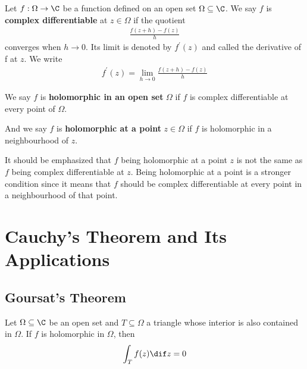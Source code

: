\documentclass[thmcnt=section, color=cyan, 12pt]{my-elegantbook}
\begin{document}
\begin{definition}
	Let $f: \Omega \to \C$ be a function defined on an open set $\Omega \subseteq \C$.
	We say $f$ is \textbf{complex differentiable}
	at $z \in \Omega$ if the quotient
	\begin{align*}
		\frac{f(z + h) - f(z)}{h}
	\end{align*}
	converges when $h \to 0$.
	Its limit is denoted by $f^\prime(z)$
	and called the derivative of f at $z$.
	We write
	\begin{align*}
		f^\prime(z) = \lim_{h \to 0} \frac{f(z + h) - f(z)}{h}
	\end{align*}

	We say $f$ is \textbf{holomorphic in an open set} $\Omega$
	if $f$ is complex differentiable at every point of $\Omega$.

	And we say $f$ is \textbf{holomorphic at a point} $z \in \Omega$ if $f$ is holomorphic in a neighbourhood of $z$.
\end{definition}

\begin{note}
	It should be emphasized that $f$ being holomorphic at a point $z$
	is not the same as $f$ being complex differentiable at $z$.
	Being holomorphic at a point is a stronger condition since
	it means that $f$ should be complex differentiable
	at every point in a neighbourhood of that point.
\end{note}


\chapter{Cauchy's Theorem and Its Applications}


\section{Goursat's Theorem}

\begin{theorem} \label{thm:4}
	Let $\Omega \subseteq \C$ be an open set and $T \subseteq \Omega$ a triangle whose interior is also contained in $\Omega$.
	If $f$ is holomorphic in $\Omega$, then
	\begin{align*}
		\int_{T} f(z) \dif z = 0
	\end{align*}
\end{theorem}
\end{document}
